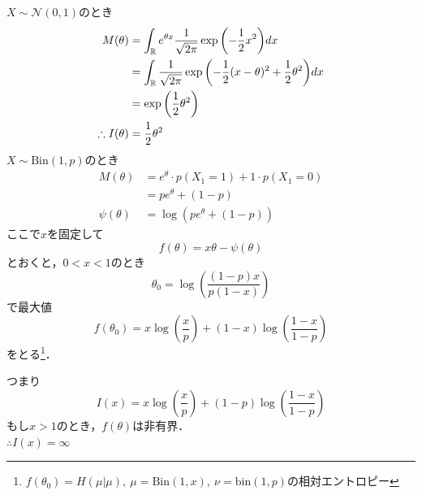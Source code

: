 \documentclass[dvipdfmx, leqno]{jsbook}
\begin{document}
    $X\sim \mathcal{N}(0, 1)$のとき
\begin{align}
    M(\theta)
    &= \int_{\mathbb{R}} e^{\theta x} \frac{1}{\sqrt{2\pi}}\exp{\left(-\frac{1}{2}x^2\right)}dx\\
    &= \int_{\mathbb{R}}\frac{1}{\sqrt{2\pi}}\exp{\left(-\frac{1}{2}(x- \theta)^2+ \frac{1}{2}\theta^2\right)}dx\\
    &= \exp{\left(\frac{1}{2}\theta^2\right)}\\
    \therefore I(\theta)&= \frac{1}{2}\theta^2
\end{align}
$X\sim \mathrm{Bin}(1, p)$のとき
\begin{align}
    M(\theta)
    &= e^\theta\cdot p(X_1= 1)+ 1\cdot p(X_1= 0)\\
    &= pe^\theta+ (1- p)\\
    \psi(\theta)&= \log{(pe^\theta+ (1- p))}
\end{align}
    ここで$x$を固定して
\begin{equation}
    f(\theta)= x\theta- \psi(\theta)
\end{equation}
    とおくと，$0< x< 1$のとき
\begin{equation}
    \theta_0= \log{\left(\frac{(1- p)x}{p(1- x)}\right)}
\end{equation}
    で最大値
\begin{equation}
    f(\theta_0)= x\log{\left(\frac{x}{p}\right)}+ (1- x)\log{\left(\frac{1- x}{1- p}\right)}
\end{equation}
    をとる\footnote{$f(\theta_0)= H(\mu|\mu),\ \mu= \mathrm{Bin}(1, x),\ \nu= \mathrm{bin}(1, p)$の相対エントロピー}．

    つまり
\begin{equation}
    I(x)= x\log{\left(\frac{x}{p}\right)}+ (1- p)\log{\left(\frac{1- x}{1- p}\right)}
\end{equation}
    もし$x> 1$のとき，$f(\theta)$は非有界．\\
    $\therefore I(x)= \infty$
\end{document}
